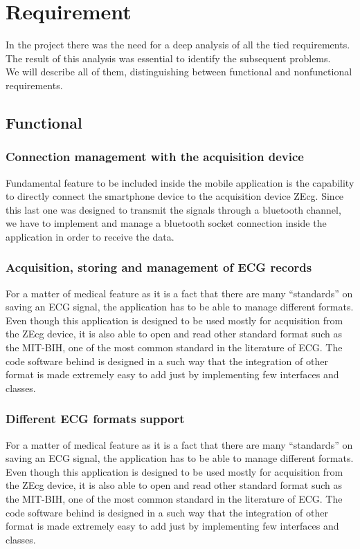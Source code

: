 \chapter{Requirement}
\label{Chapter5}
In the project there was the need for a deep analysis of all the tied requirements. The result of this analysis was essential to identify the subsequent problems.\\
We will describe all of them, distinguishing between functional and nonfunctional requirements.
\section{Functional}
\subsection{Connection management with the acquisition device}
Fundamental feature to be included inside the mobile application is the capability to directly connect the smartphone device to the acquisition device ZEcg. Since this last one was designed to transmit the signals through a bluetooth channel, we have to implement and manage a bluetooth socket connection inside the application in order to receive the data.
\subsection{Acquisition, storing and management of ECG records}
For a matter of medical feature as it is a fact that there are many “standards” on saving an ECG signal, the application has to be able to manage different formats. Even though this application is designed to be used mostly for acquisition from the ZEcg device, it is also able to open and read other standard format such as the MIT-BIH, one of the most common standard in the literature of ECG. The code software behind is designed in a such  way that the integration of other format is made extremely easy to add just by implementing few interfaces and classes.

\subsection{Different ECG formats support}
For a matter of medical feature as it is a fact that there are many “standards” on saving an ECG signal, the application has to be able to manage different formats. Even though this application is designed to be used mostly for acquisition from the ZEcg device, it is also able to open and read other standard format such as the MIT-BIH, one of the most common standard in the literature of ECG. The code software behind is designed in a such  way that the integration of other format is made extremely easy to add just by implementing few interfaces and classes.

